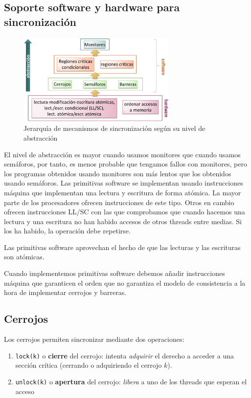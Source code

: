 \documentclass[10pt,a4paper,spanish]{report}
\begin{document}
\textcolor[rgb]{0.2,0.4,0.8}{\subsection{Soporte software y hardware para sincronización}}
\begin{figure}[!h]
\centering
\includegraphics[width=0.7\textwidth]{79}
\caption{Jerarquía de mecanismos de sincronización según su nivel de abstracción}
\label{clasif_sinc}
\end{figure}

El nivel de abstracción es mayor cuando usamos monitores que cuando usamos semáforos, por tanto, es menos probable que tengamos fallos con monitores, pero los programas obtenidos usando monitores son más lentos que los obtenidos usando semáforos. Las primitivas software se implementan usando instrucciones máquina que implementan una lectura y escritura de forma atómica. La mayor parte de los procesadores ofrecen instrucciones de este tipo. Otros en cambio ofrecen instrucciones LL/SC con las que comprobamos que cuando hacemos una lectura y una escritura no han habido accesos de otros threads entre medias. Si los ha habido, la operación debe repetirse.

Las primitivas software aprovechan el hecho de que las lecturas y las escrituras son atómicas. 

Cuando implementemos primitivas software debemos añadir instrucciones máquina que garanticen el orden que no garantiza el modelo de consistencia a la hora de implementar cerrojos y barreras.

\textcolor[rgb]{0.2,0.4,0.8}{\subsection{Cerrojos}}
Los cerrojos permiten sincronizar mediante dos operaciones:
\begin{enumerate}[\color{azul}{\bf $\heartsuit$}]
    \item \verb*|lock(k)| o \textbf{\textcolor[rgb]{0.2,0.4,0.8}{cierre}} del cerrojo: intenta \textcolor[rgb]{0.2,0.4,0.8}{\textit{adquirir}} el derecho a acceder a una sección crítica (cerrando o adquiriendo el cerrojo $k$).
    \item \verb*|unlock(k)| o \textbf{\textcolor[rgb]{0.2,0.4,0.8}{apertura}} del cerrojo: \textcolor[rgb]{0.2,0.4,0.8}{\textit{libera}} a uno de los threads que esperan el acceso
\end{enumerate}
\end{document}

